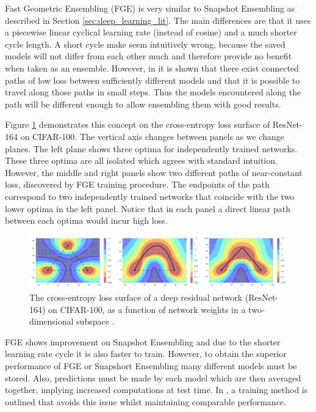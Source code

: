 Fast Geometric Ensembling (FGE) is very similar to Snapshot Ensembling as described in Section \ref{sec:deep_learning_lit}.
The main differences are that it uses a piecewise linear cyclical learning rate (instead of cosine) and a much shorter cycle length.
A short cycle make seem intuitively wrong, because the saved models will not differ from each other much and therefore provide no benefit when taken as an ensemble.
However, in \cite{Garipov_Izmailov_Podoprikhin_Vetrov_Wilson_2018} it is shown that there exist connected paths of low loss between sufficiently different models and that it is possible to travel along those paths in small steps.
Thus the models encountered along the path will be different enough to allow ensembling them with good results.

Figure \ref{fig:FGE_shortest_path} demonstrates this concept on the cross-entropy loss surface of ResNet-164 on CIFAR-100.
The vertical axis changes between panels as we change planes.
The left plane shows three optima for independently trained networks.
These three optima are all isolated which agrees with standard intuition.
However, the middle and right panels show two different paths of near-constant loss, discovered by FGE training procedure.
The endpoints of the path correspond to two independently trained networks that coincide with the two lower optima in the left panel.
Notice that in each panel a direct linear path between each optima would incur high loss.

\begin{figure}[hbtp!]
    \centering
    \includegraphics[width=\textwidth]{./img/FGE.png}
    \caption{The cross-entropy loss surface of a deep residual network (ResNet-164) on CIFAR-100, as a function of network weights in a two-dimensional subspace \cite{Garipov_Izmailov_Podoprikhin_Vetrov_Wilson_2018}.}
    \label{fig:FGE_shortest_path}
\end{figure}

FGE shows improvement on Snapshot Ensembling and due to the shorter learning rate cycle it is also faster to train.
However, to obtain the superior performance of FGE or Snapshort Ensembling many different models must be stored.
Also, predictions must be made by each model which are then averaged together, implying increased computations at test time.
In \cite{Izmailov_Podoprikhin_Garipov_Vetrov_Wilson_2018}, a training method is outlined that avoids this issue whilst maintaining comparable performance.

